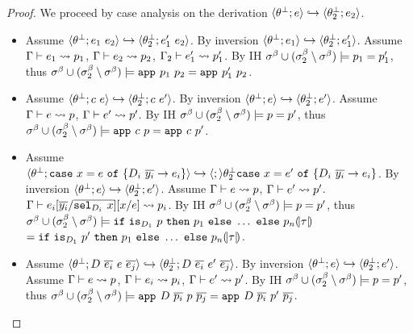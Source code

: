 \begin{proof}
We proceed by case analysis on the derivation 
$\langle {\theta_{}^\perp}; e\rangle\hookrightarrow\langle {\theta_{2}^\perp}; e_2\rangle$.
\begin{itemize}
\item 
Assume
	$\track{\tsub{}}{\refa_1\ \refa_2}\hookrightarrow\track{\tsub{2}}{\refa_1'\ \refa_2}$. 
By inversion 
	$\langle {\theta_{}^\perp}; e_1\rangle\hookrightarrow\langle {\theta_{2}^\perp}; e_1'\rangle$.
Assume
  $ \Gamma\vdash e_1 \rightsquigarrow p_1 $, 	
  $ \Gamma\vdash e_2 \rightsquigarrow p_2 $, 	
  $ \Gamma_2\vdash e_1' \rightsquigarrow p_1' $.  	
By IH 
  $\sigma^\beta \cup (\sigma^\beta_2 \setminus \sigma^\beta)
    \models p_1 = p_1'$, 
thus  
  $\sigma^\beta \cup (\sigma^\beta_2 \setminus \sigma^\beta)
    \models \texttt{app}^{}_{}\ {p_1}\ {p_2} = \texttt{app}^{}_{}\ {p_1'}\ {p_2}$. 
    
\item 
Assume
	$\track{\tsub{}}{c\ \refa}\hookrightarrow\track{\tsub{2}}{c\ \refa'}$. 
By inversion 
	$\langle {\theta_{}^\perp}; e\rangle\hookrightarrow\langle {\theta_{2}^\perp}; e'\rangle$.
Assume
  $ \Gamma\vdash e \rightsquigarrow p $,	
  $ \Gamma\vdash e' \rightsquigarrow p' $.  	
By IH 
  $\sigma^\beta \cup (\sigma^\beta_2 \setminus \sigma^\beta)
    \models p = p'$, 
thus  
  $\sigma^\beta \cup (\sigma^\beta_2 \setminus \sigma^\beta)
    \models \texttt{app}^{}_{}\ {c}\ {p} = \texttt{app}^{}_{}\ {c}\ {p'}$. 

\item 
Assume
	$\track{\tsub{}}{\ecase{x}{\refa}{\dc_i}{\overline{y_i}}{e_i}}
	  \hookrightarrow\track
	  {\tsub{2}}{\ecase{x}{\refa'}{\dc_i}{\overline{y_i}}{e_i}}$. 
By inversion 
	$\langle {\theta_{}^\perp}; e\rangle\hookrightarrow\langle {\theta_{2}^\perp}; e'\rangle$.
Assume
  $ \Gamma\vdash e \rightsquigarrow p $,	
  $ \Gamma\vdash e' \rightsquigarrow p' $.  	
  $\tologicshort{\env}{e_i\subst{\overline{y_i}}{\overline{\selector{\dc_i}{}\ x}}\subst{x}{e}}{\typ}{\pred_i}{\embed{\typ}}{\smtenv}{\axioms_i}$.
By IH 
  $\sigma^\beta \cup (\sigma^\beta_2 \setminus \sigma^\beta)
    \models p = p'$, 
thus  
  $\bmodel \cup (\bmodel_2 \setminus \bmodel)
   \models
	 {\eif{\checkdc{\dc_1}\ \pred}{\pred_1}{\ldots} \ \mathtt{else}\ \pred_n}{\embed{\typ}}
 $\\ $=
	 {\eif{\checkdc{\dc_1}\ \pred'}{\pred_1}{\ldots} \ \mathtt{else}\ \pred_n}{\embed{\typ}}
  $.	 

\item 
Assume
	$\track{\tsub{}}{D\ \overline{\refa_i}\ \refa\ \overline{\refa_j}}
	\hookrightarrow\track{\tsub{2}}{D\ \overline{\refa_i}\ \refa'\ \overline{\refa_j}}$. 
By inversion 
	$\langle {\theta_{}^\perp}; e\rangle\hookrightarrow\langle {\theta_{2}^\perp}; e'\rangle$.
Assume
  $ \Gamma\vdash e \rightsquigarrow p $,	
  $ \Gamma\vdash e_i \rightsquigarrow p_i $,	
  $ \Gamma\vdash e' \rightsquigarrow p' $.  	
By IH 
  $\sigma^\beta \cup (\sigma^\beta_2 \setminus \sigma^\beta)
    \models p = p'$, 
thus  
  $\bmodel \cup (\bmodel_2 \setminus \bmodel)
    \models \smapp{D}{\overline{\pred_i}\ \pred\ \overline{\pred_j}} 
          = \smapp{D}{\overline{\pred_i}\ \pred'\ \overline{\pred_j}}$. 


\end{itemize}
\end{proof}
